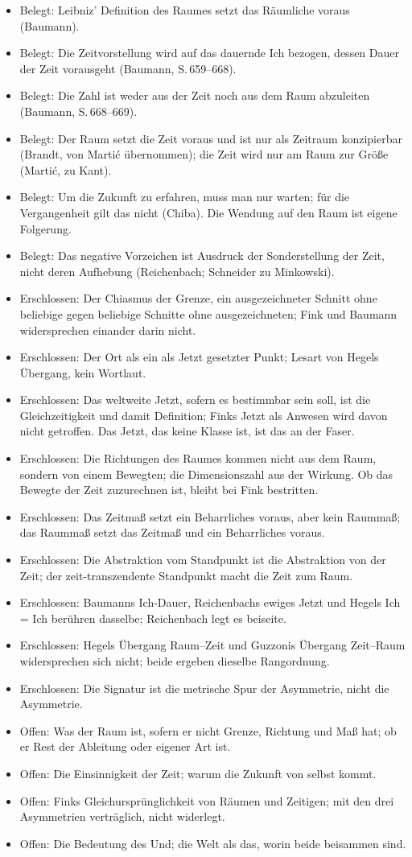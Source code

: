 \begin{itemize}
\item Belegt: Leibniz' Definition des Raumes setzt das Räumliche voraus (Baumann).
\item Belegt: Die Zeitvorstellung wird auf das dauernde Ich bezogen, dessen Dauer der Zeit vorausgeht (Baumann, S.\,659--668).
\item Belegt: Die Zahl ist weder aus der Zeit noch aus dem Raum abzuleiten (Baumann, S.\,668--669).
\item Belegt: Der Raum setzt die Zeit voraus und ist nur als Zeitraum konzipierbar (Brandt, von Martić übernommen); die Zeit wird nur am Raum zur Größe (Martić, zu Kant).
\item Belegt: Um die Zukunft zu erfahren, muss man nur warten; für die Vergangenheit gilt das nicht (Chiba). Die Wendung auf den Raum ist eigene Folgerung.
\item Belegt: Das negative Vorzeichen ist Ausdruck der Sonderstellung der Zeit, nicht deren Aufhebung (Reichenbach; Schneider zu Minkowski).
\item Erschlossen: Der Chiasmus der Grenze, ein ausgezeichneter Schnitt ohne beliebige gegen beliebige Schnitte ohne ausgezeichneten; Fink und Baumann widersprechen einander darin nicht.
\item Erschlossen: Der Ort als ein als Jetzt gesetzter Punkt; Lesart von Hegels Übergang, kein Wortlaut.
\item Erschlossen: Das weltweite Jetzt, sofern es bestimmbar sein soll, ist die Gleichzeitigkeit und damit Definition; Finks Jetzt als Anwesen wird davon nicht getroffen. Das Jetzt, das keine Klasse ist, ist das an der Faser.
\item Erschlossen: Die Richtungen des Raumes kommen nicht aus dem Raum, sondern von einem Bewegten; die Dimensionszahl aus der Wirkung. Ob das Bewegte der Zeit zuzurechnen ist, bleibt bei Fink bestritten.
\item Erschlossen: Das Zeitmaß setzt ein Beharrliches voraus, aber kein Raummaß; das Raummaß setzt das Zeitmaß und ein Beharrliches voraus.
\item Erschlossen: Die Abstraktion vom Standpunkt ist die Abstraktion von der Zeit; der zeit-transzendente Standpunkt macht die Zeit zum Raum.
\item Erschlossen: Baumanns Ich-Dauer, Reichenbachs ewiges Jetzt und Hegels Ich = Ich berühren dasselbe; Reichenbach legt es beiseite.
\item Erschlossen: Hegels Übergang Raum--Zeit und Guzzonis Übergang Zeit--Raum widersprechen sich nicht; beide ergeben dieselbe Rangordnung.
\item Erschlossen: Die Signatur ist die metrische Spur der Asymmetrie, nicht die Asymmetrie.
\item Offen: Was der Raum ist, sofern er nicht Grenze, Richtung und Maß hat; ob er Rest der Ableitung oder eigener Art ist.
\item Offen: Die Einsinnigkeit der Zeit; warum die Zukunft von selbst kommt.
\item Offen: Finks Gleichursprünglichkeit von Räumen und Zeitigen; mit den drei Asymmetrien verträglich, nicht widerlegt.
\item Offen: Die Bedeutung des Und; die Welt als das, worin beide beisammen sind.
\end{itemize}
